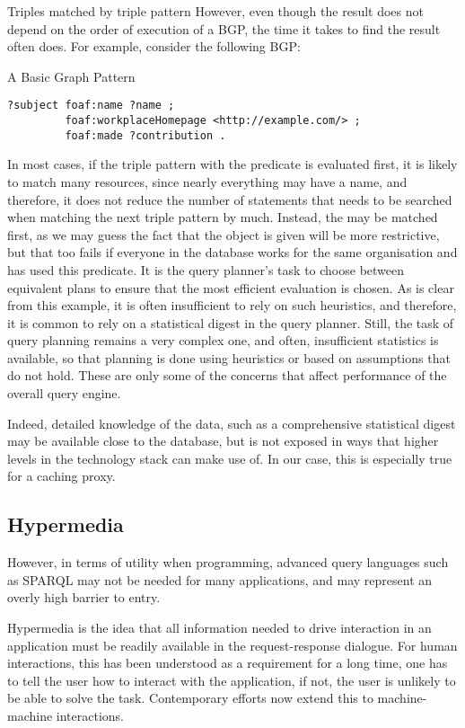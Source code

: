 \begin{example}{Triples matched by triple pattern}
However, even though the result does not depend on the order of
execution of a BGP, the time it takes to find the result often does. For
example, consider the following BGP:
\begin{example}{A Basic Graph Pattern}
\begin{verbatim}
?subject foaf:name ?name ;
         foaf:workplaceHomepage <http://example.com/> ;
         foaf:made ?contribution .
\end{verbatim}
\end{example}
In most cases, if the triple pattern with the 
predicate is evaluated first, it is likely to match many resources,
since nearly everything may have a name, and therefore, it does not
reduce the number of statements that needs to be searched when
matching the next triple pattern by much. Instead, the
 may be matched first, as we may guess
the fact that the object is given will be more restrictive, but that
too fails if everyone in the database works for the same organisation
and has used this predicate. It is the query planner's task to choose
between equivalent plans to ensure that the most efficient evaluation
is chosen. As is clear from this example, it is often insufficient to
rely on such heuristics, and therefore, it is common to rely on a
statistical digest in the query planner. Still, the task of query
planning remains a very complex one, and often, insufficient
statistics is available, so that planning is done using heuristics or
based on assumptions that do not hold. These are only some of the
concerns that affect performance of the overall query engine.

Indeed, detailed knowledge of the data, such as a comprehensive
statistical digest may be available close to the database, but is not
exposed in ways that higher levels in the technology stack can make
use of. In our case, this is especially true for a caching proxy.

\subsection{Hypermedia}

However, in terms of utility when programming, advanced query
languages such as SPARQL may not be needed for many applications, and
may represent an overly high barrier to entry.

Hypermedia is the idea that all information needed to drive
interaction in an application must be readily available in the
request-response dialogue. For human interactions, this has been
understood as a requirement for a long time, one has to tell the user
how to interact with the application, if not, the user is unlikely to
be able to solve the task. Contemporary efforts now extend this to
machine-machine interactions. 


\end{example}
